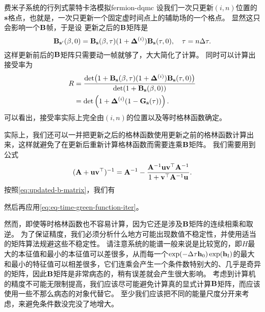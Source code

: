 \begin{back}{费米子系统的行列式蒙特卡洛模拟}{fermion-dqmc}
    设我们一次只更新$(i, n)$位置的$\vb{s}$格点，也就是，一次只更新一个固定虚时间点上的辅助场的一个格点。
    显然这只会影响一个$\vb{B}$帧，于是设
    更新之后的$\vb{B}$矩阵是
    \begin{equation}
        \vb{B}_{\vb{s}'}(\beta, 0) = \vb{B}_{\vb{s}}(\beta, \tau) (1 + \vb{\Delta}^{(i)}) \vb{B}_{\vb{s}}(\tau, 0), \quad \tau = n \Delta \tau.
        \label{eq:updated-b-matrix}
    \end{equation}
    这样更新前后的$\vb{B}$矩阵只需要动一帧就够了，大大简化了计算。
    同时可以计算出接受率为
    \begin{equation}
        \begin{aligned}
            R &= \frac{\det(1 + \vb{B}_{\vb{s}}(\beta, \tau) (1 + \vb{\Delta}^{(i)}) \vb{B}_{\vb{s}}(\tau, 0))}{\det(1 + \vb{B}_{\vb{s}}(\beta, 0))} \\
            &= \det \left( 1 + \vb{\Delta}^{(i)} (1 - \vb{G}_{\vb{s}}(\tau)) \right).
        \end{aligned}
    \end{equation}
    可以看出，接受率实际上完全由$(i, n)$的位置以及等时格林函数确定。

    实际上，我们还可以一并把更新之后的格林函数使用更新之前的格林函数计算出来，这样就避免了在更新后重新计算格林函数而需要连乘$\vb{B}$矩阵。
    我们需要用到公式
    \[
        (\vb{A} + \vb{u} \vb{v}^\top)^{-1} = \vb{A}^{-1} - \frac{\vb{A}^{-1} \vb{u} \vb{v}^\top \vb{A}^{-1}}{1 + \vb{v}^\top \vb{A}^{-1} \vb{u}}.
    \]
    按照\eqref{eq:updated-b-matrix}，我们有

    然后再应用\eqref{eq:eq-time-green-function-iter}。%

    然而，即使等时格林函数也不容易计算，因为它还是涉及$\vb{B}$矩阵的连续相乘和取逆。
    为了保证精度，我们必须分析什么地方可能出现数值不稳定性，并使用适当的矩阵算法规避这些不稳定性。
    请注意系统的能谱一般来说是比较宽的，即${H}$最大的本征值和最小的本征值可以差很多，从而每一个$\exp(-\Delta \tau \vb{h}_0) \exp(\vb{h}_\text{I})$的最大和最小的特征值可以相差很多，它们连乘会产生一个条件数特别大的、几乎是奇异的矩阵，因此$\vb{B}$矩阵是非常病态的，稍有误差就会产生很大影响。
    考虑到计算机的精度不可能无限制提高，我们应该尽可能避免计算真的显式计算$\vb{B}$矩阵，而应该使用一些不那么病态的对象代替它。
    至少我们应该把不同的能量尺度分开来考虑，来避免条件数没完没了地增大。


\end{back}
